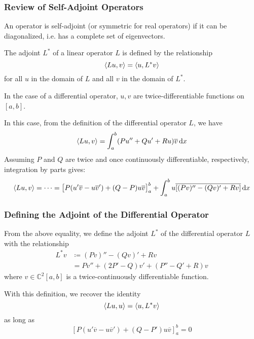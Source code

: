 \documentclass[11pt, a4paper]{article}
\newcommand{\diff}{\mathop{}\!\mathrm{d}} %
\newcommand{\C}{\mathbb{C}} %
\begin{document}
\subsubsection{Review of Self-Adjoint Operators}
An operator is self-adjoint (or symmetric for real operators) if it can be diagonalized, i.e. has a complete set of eigenvectors.

The adjoint $ L^* $ of a linear operator $ L $ is defined by the relationship
\begin{equation*}
	\expval{Lu, v} = \expval{u, L^*v}
\end{equation*}
for all $ u $ in the domain of $ L $ and all $ v $ in the domain of $ L^* $.

In the case of a differential operator, $ u, v $ are twice-differentiable functions on $ [a, b] $.

In this case, from the definition of the differential operator $ L $, we have
\begin{equation*}
	\expval{Lu, v} = \int_{a}^{b} (Pu'' + Q u' + R u) \overline{v} \diff x
\end{equation*}
Assuming $ P $ and $ Q $ are twice and once continuously differentiable, respectively, integration by parts gives:
\begin{equation*}
	\expval{Lu, v} = \dots = \big[P(u' \overline{v} - u \overline{v}') + (Q - P)u\overline{v} \big]_{a}^{b} + \int_{a}^{b} u \overline{[(Pv)'' - (Qv)' + Rv]} \diff x
\end{equation*}

\subsubsection{Defining the Adjoint of the Differential Operator}
From the above equality, we define the adjoint $ L^* $ of the differential operator $ L $ with the relationship
\begin{align*}
	L^* v &\coloneqq (Pv)'' - (Qv)' + Rv \\
	&=Pv'' + (2P' - Q)v' + (P'' - Q' + R)v
\end{align*}
where $ v \in \C^2[a, b] $ is a twice-continuously differentiable function.

With this definition, we recover the identity
\begin{equation*}
	\expval{Lu, u} = \expval{u, L^*v}
\end{equation*}
as long as
\begin{equation*}
	\left[P(u'\overline{v} - u \overline{v}') + (Q - P')u\overline{v}\right]_{a}^{b} = 0
\end{equation*}
\end{document}
